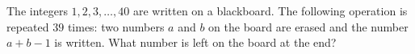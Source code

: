 The integers $1,2,3,\dots,40$ are written on a blackboard. The following operation is repeated $39$ times: two numbers $a$ and $b$ on the board are erased and the number $a+b-1$ is written. What number is left on the board at the end?
